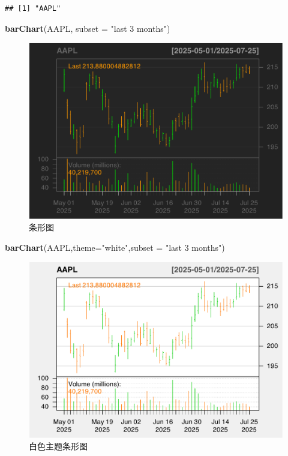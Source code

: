 \documentclass[]{ctexbook}
\newenvironment{Shaded}{\begin{snugshade}}{\end{snugshade}}
\newcommand{\AttributeTok}[1]{\textcolor[rgb]{0.13,0.29,0.53}{#1}}
\newcommand{\FunctionTok}[1]{\textcolor[rgb]{0.13,0.29,0.53}{\textbf{#1}}}
\newcommand{\NormalTok}[1]{#1}
\newcommand{\StringTok}[1]{\textcolor[rgb]{0.31,0.60,0.02}{#1}}
\begin{document}
\begin{verbatim}
## [1] "AAPL"
\end{verbatim}

\begin{Shaded}
\begin{Highlighting}[]
\FunctionTok{barChart}\NormalTok{(AAPL, }\AttributeTok{subset =} \StringTok{"last 3 months"}\NormalTok{)}
\end{Highlighting}
\end{Shaded}

\begin{figure}
\includegraphics[width=0.9\linewidth]{QuantmodHandbook_files/figure-latex/bar-1} \caption{条形图}\label{fig:bar}
\end{figure}

\begin{Shaded}
\begin{Highlighting}[]
\FunctionTok{barChart}\NormalTok{(AAPL,}\AttributeTok{theme=}\StringTok{"white"}\NormalTok{,}\AttributeTok{subset =} \StringTok{"last 3 months"}\NormalTok{)}
\end{Highlighting}
\end{Shaded}

\begin{figure}
\includegraphics[width=0.9\linewidth]{QuantmodHandbook_files/figure-latex/barWhite-1} \caption{白色主题条形图}\label{fig:barWhite}
\end{figure}
\end{document}
